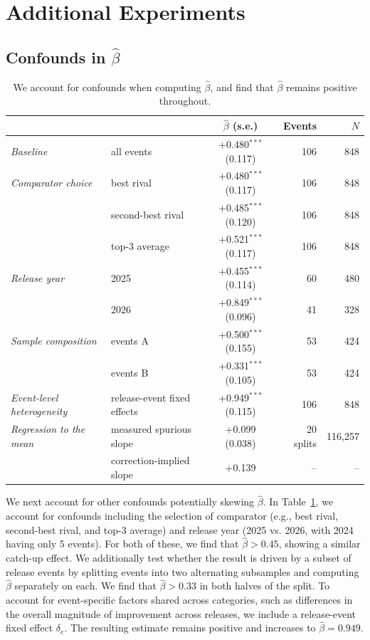 \section{Additional Experiments}
\subsection{Confounds in $\hat{\beta}$}
\label{app:confounds}

\begin{table}
\caption{We account for confounds when computing $\hat{\beta}$, and find that $\hat{\beta}$ remains positive throughout.}
\label{tab:beta_confounds}
\begin{tabular}{llcrr}
\toprule
& & $\hat\beta$ (s.e.) & Events & $N$ \\
\midrule
\emph{Baseline} & all events & +0.480$^{***}$ (0.117) & 106 & 848 \\
\addlinespace
\emph{Comparator choice} & best rival & +0.480$^{***}$ (0.117) & 106 & 848 \\
& second-best rival & +0.485$^{***}$ (0.120) & 106 & 848 \\
& top-3 average & +0.521$^{***}$ (0.117) & 106 & 848 \\
\addlinespace
\emph{Release year} & 2025 & +0.455$^{***}$ (0.114) & 60 & 480 \\
& 2026 & +0.849$^{***}$ (0.096) & 41 & 328 \\
\addlinespace
\emph{Sample composition} & events A & +0.500$^{***}$ (0.155) & 53 & 424 \\
& events B & +0.331$^{***}$ (0.105) & 53 & 424 \\
\addlinespace
\emph{Event-level heterogeneity} & release-event fixed effects & +0.949$^{***}$ (0.115) & 106 & 848 \\
\midrule
\emph{Regression to the mean} & measured spurious slope & +0.099 (0.038) & 20 splits & 116,257 \\
& correction-implied slope & +0.139 & -- & -- \\
\bottomrule
\end{tabular}
\end{table}

We next account for other confounds potentially skewing $\hat{\beta}$. 
In Table~\ref{tab:beta_confounds}, we account for confounds including the selection of comparator (e.g., best rival, second-best rival, and top-3 average) and release year (2025 vs. 2026, with 2024 having only $5$ events).
For both of these, we find that $\hat{\beta}>0.45$, showing a similar catch-up effect. 
We additionally test whether the result is driven by a subset of release events by splitting events into two alternating subsamples and computing \(\hat{\beta}\) separately on each. 
We find that \(\hat{\beta}>0.33\) in both halves of the split.
To account for event-specific factors shared across categories, such as differences in the overall magnitude of improvement across releases, we include a release-event fixed effect \(\delta_e\).  
The resulting estimate remains positive and increases to \(\hat\beta=0.949\). 


